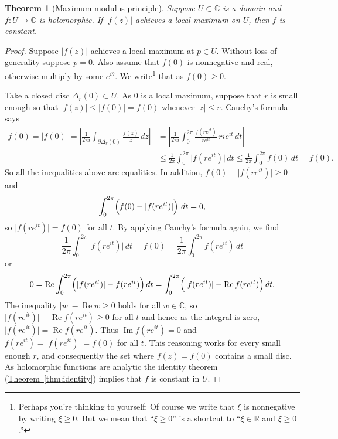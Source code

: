 \documentclass[12pt,openany]{book}
\renewcommand{\Re}{\operatorname{Re}}
\renewcommand{\Im}{\operatorname{Im}}
\newcommand{\sabs}[1]{\lvert {#1} \rvert}
\newcommand{\abs}[1]{\left\lvert {#1} \right\rvert}
\newcommand{\C}{{\mathbb{C}}}
\newcommand{\R}{{\mathbb{R}}}
\newcommand{\myquote}[1]{``#1''}
\theoremstyle{plain}
\newtheorem{thm}{Theorem}[section]
\theoremstyle{remark}
\theoremstyle{definition}
\theoremstyle{exercise}
\theoremstyle{example}
\newcommand{\thmref}[1]{\hyperref[#1]{Theorem~\ref*{#1}}}
\begin{document}
\begin{thm}[Maximum modulus principle]
%
%
Suppose $U \subset \C$ is a domain and
$f \colon U \to \C$ is holomorphic.
If $\sabs{f(z)}$ achieves a local maximum on $U$, then $f$ is constant.
\end{thm}

\begin{proof}
Suppose $\sabs{f(z)}$ achieves a local maximum at $p \in U$.
Without loss of generality suppose $p = 0$.
Also assume that $f(0)$ is nonnegative and real, otherwise multiply by 
some $e^{i\theta}$.
We write\footnote{%
Perhaps you're thinking to yourself: Of course we write that $\xi$ is
nonnegative by writing $\xi \geq 0$.
But we mean that \myquote{$\xi \geq 0$}
is a shortcut to \myquote{$\xi \in \R$ and $\xi \geq 0$.}}
that as $f(0) \geq 0$.

Take a closed disc $\overline{\Delta_r(0)} \subset U$.
As $0$ is a local maximum, suppose that $r$ is small enough
so that
$\sabs{f(z)} \leq \sabs{f(0)} = f(0)$ whenever $\sabs{z} \leq r$.
Cauchy's formula says
\begin{equation*}
\begin{split}
f(0) = \sabs{f(0)} =
\abs{\frac{1}{2\pi i}
\int_{\partial \Delta_r(0)}
\frac{f(z)}{z} \, dz
}
& =
\abs{
\frac{1}{2\pi i}
\int_0^{2\pi}
\frac{f(re^{it})}{re^{it}} \, ri e^{it} \, dt
}
\\
& \leq
\frac{1}{2\pi}
\int_0^{2\pi}
\sabs{f(re^{it})}\, dt
\leq
\frac{1}{2\pi}
\int_0^{2\pi}
f(0)\, dt = f(0) .
\end{split}
\end{equation*}
So all the inequalities above are equalities.
In addition, $f(0)-\sabs{f(re^{it})} \geq 0$ and
\begin{equation*}
\int_0^{2\pi}\Bigl( f(0)-\sabs{f(re^{it})} \Bigr) \ dt = 0 ,
\end{equation*}
so $\sabs{f(re^{it})} = f(0)$ for all $t$.
By applying Cauchy's formula
again, we find
\begin{equation*}
\frac{1}{2\pi}
\int_0^{2\pi}
\sabs{f(re^{it})}\, dt
=
f(0)
=
\frac{1}{2\pi}
\int_0^{2\pi}
f(re^{it})\, dt
\end{equation*}
or
\begin{equation*}
0 =
\Re \int_0^{2\pi}
\Bigl(\sabs{f(re^{it})}-f(re^{it})\Bigr)\, dt
=
\int_0^{2\pi}
\Bigl(\sabs{f(re^{it})}-\Re f(re^{it})\Bigr)\, dt .
\end{equation*}
The inequality $\sabs{w} - \Re w \geq 0$ holds for all $w \in \C$,
so
$\sabs{f(re^{it})}-\Re f(re^{it}) \geq 0$ for all $t$ and hence
as the integral is zero,
$\sabs{f(re^{it})}=\Re f(re^{it})$.  Thus $\Im f(re^{it}) = 0$
and 
$f(re^{it})=\sabs{f(re^{it})} = f(0)$ for all $t$.
This reasoning works for every small enough $r$, and consequently the set where
$f(z) = f(0)$ contains a small disc.  As holomorphic functions are analytic
the identity theorem (\thmref{thm:identity}) implies that $f$ is constant in
$U$.
\end{proof}
\end{document}
